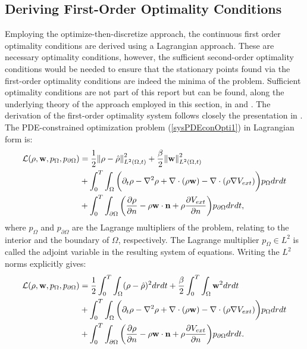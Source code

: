 \subsection{Deriving First-Order Optimality Conditions}
Employing the  optimize-then-discretize approach, the continuous first order optimality conditions are derived using a Lagrangian approach. These are necessary optimality conditions, however, the sufficient second-order optimality conditions would be needed to ensure that the stationary points found via the first-order optimality conditions are indeed the minima of the problem. Sufficient optimality conditions are not part of this report but can be found, along the underlying theory of the approach employed in this section, in \cite{DeLosReyesOptimization} and \cite{TroeltzschFredi2010OCoP}. The derivation of the first-order optimality system follows closely the presentation in \cite{TroeltzschFredi2010OCoP}.  
The PDE-constrained optimization problem (\ref{sysPDEconOpti1}) in Lagrangian form is:
\begin{align*}
\mathcal{L}(\rho,\mathbf{w}, p_\Omega, p_{\partial \Omega}) &= \frac{1}{2} \norm{\rho- \hat{\rho}}_{L^2(\Omega,t)}^2+ \frac{\beta}{2} \norm{\mathbf{w}}_{L^2(\Omega,t)}^2 \\
&+  \int_0^T \int_\Omega\bigg( \partial_t \rho - \nabla^2 \rho + \nabla \cdot (\rho \mathbf{w}) - \nabla \cdot (\rho \nabla V_{ext}) \bigg) p_\Omega dr dt  \\ 
&+ \int_0^T \int_{\partial \Omega}  \bigg(\dfrac{\partial \rho}{\partial {n}} - \rho \mathbf{w} \cdot \mathbf{n} + \rho \dfrac{\partial V_{ext}}{\partial {n}}\bigg) p_{\partial \Omega} dr dt , 
\end{align*}
where $p_\Omega$ and $p_{\partial \Omega}$ are the Lagrange multipliers of the problem, relating to the interior and the boundary of $\Omega$, respectively. The Lagrange multiplier $p_\Omega \in L^2$ is called the adjoint variable in the resulting system of equations.
Writing the $L^2$ norms explicitly gives:
\begin{align} \label{sysLagrangian1}
\mathcal{L}(\rho,\mathbf{w}, p_\Omega, p_{\partial \Omega}) &= \frac{1}{2}\int_0^T\int_\Omega  (\rho- \hat{\rho})^2 dr dt  + \frac{\beta}{2} \int_0^T \int_\Omega \mathbf{w}^2 dr dt  \\
&+ \int_0^T \int_\Omega \bigg( \partial_t \rho - \nabla^2 \rho + \nabla \cdot (\rho \mathbf{w}) - \nabla \cdot (\rho \nabla V_{ext}) \bigg) p_\Omega dr dt \notag \\ 
&+\int_0^T  \int_{\partial \Omega}  \bigg(\dfrac{\partial \rho}{\partial {n}} - \rho \mathbf{w} \cdot \mathbf{n} + \rho \dfrac{\partial V_{ext}}{\partial {n}}\bigg) p_{\partial \Omega} dr dt  \notag.
\end{align}
